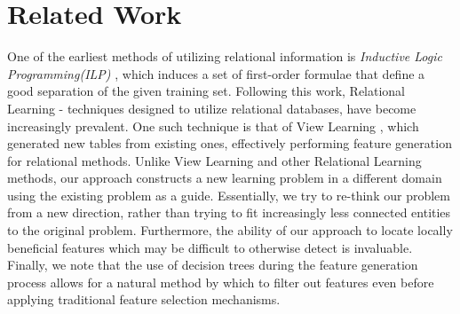 \documentclass[twoside,11pt]{article}
\theoremstyle{definition}
\begin{document}




\section{Related Work}
One of the earliest methods of utilizing relational information is \emph{Inductive Logic Programming(ILP)} \cite{quinlan1990learning,muggleton1991inductive}, which induces a set of first-order formulae that define a good separation of the given training set.
Following this work, Relational Learning - techniques designed to utilize relational databases, have become increasingly prevalent. One such technique is that of View Learning \cite{davis2005view}, which generated new tables from existing ones, effectively performing feature generation for relational methods.
Unlike View Learning and other Relational Learning methods, our approach constructs a new learning problem in a different domain using the existing problem as a guide. Essentially,  we try to re-think our problem from a new direction, rather than trying to fit increasingly less connected entities to the original problem. Furthermore, the ability of our approach to locate locally beneficial features which may be difficult to otherwise detect is invaluable. Finally, we note that the use of decision trees during the feature generation process allows for a natural method by which to filter out features even before applying traditional feature selection mechanisms.
\end{document}
